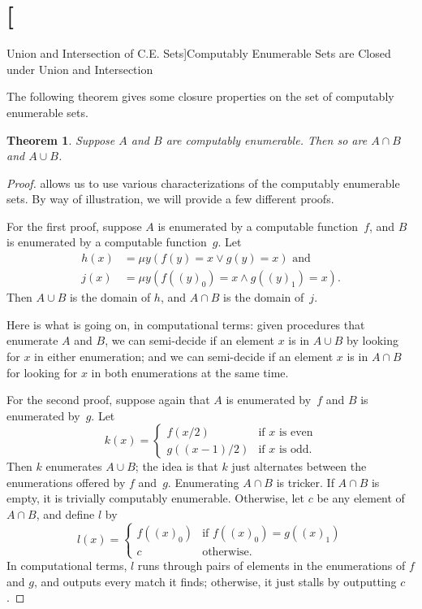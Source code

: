 \documentclass[10pt,a4paper]{article}
\makeatletter
\theoremstyle{plain}
\newtheorem{thm}{Theorem}[section]
\theoremstyle{definition}
\theoremstyle{remark}
\newenvironment{explain}{}{}
\newcommand*{\olfileid}[3]{}
\newcommand*{\olsection}[1]{\section*{#1}}
\newcommand{\olref}{\@ifnextchar[{\olref@i}{\olref@final}}
\def\olref@i[#1]{\@ifnextchar[{\olref@ii}{\olref@final}}
\def\olref@ii[#1]{\@ifnextchar[{\olref@iii}{\olref@final}}
\def\olref@iii[#1]{\olref@final}
\def\olref@final#1{\ref{#1}}
\providecommand{\umin}{\mu}
\makeatother
\begin{document}



\olfileid{cmp}{thy}{clo}

\olsection[Union and Intersection of C.E. Sets]{Computably Enumerable
  Sets are Closed under Union and Intersection}

The following theorem gives some closure properties on the set of
computably enumerable sets.

\begin{thm}
Suppose $A$ and $B$ are computably enumerable. Then so are $A \cap B$
and $A \cup B$.
\end{thm}

\begin{proof}
\olref[eqc]{thm:ce-equiv} allows us to use various characterizations
of the computably enumerable sets. By way of illustration, we will
provide a few different proofs.

For the first proof, suppose $A$ is enumerated by a computable
function~$f$, and $B$ is enumerated by a computable function~$g$. Let
\begin{align*}
h(x) & = \umin{y}{(f(y) = x \lor g(y) = x)} \text{ and}\\
j(x) & = \umin{y}{(f((y)_0) = x \land g((y)_1) = x)}.
\end{align*}
Then $A \cup B$ is the domain of $h$, and $A \cap B$ is the domain
of~$j$.

\begin{explain}
Here is what is going on, in computational terms: given
procedures that enumerate $A$ and $B$, we can semi-decide if an
element $x$ is in $A \cup B$ by looking for $x$ in either enumeration;
and we can semi-decide if an element $x$ is in $A \cap B$ for looking
for $x$ in both enumerations at the same time.
\end{explain}

For the second proof, suppose again that $A$ is enumerated by~$f$ and
$B$ is enumerated by~$g$. Let
\[
k(x) = \begin{cases}
f(x/2) & \text{if $x$ is even} \\
g((x-1)/2) & \text{if $x$ is odd.}
\end{cases}
\]
Then $k$ enumerates $A \cup B$; the idea is that $k$ just alternates
between the enumerations offered by $f$ and~$g$. Enumerating $A \cap
B$ is tricker. If $A \cap B$ is empty, it is trivially computably
enumerable. Otherwise, let $c$ be any element of $A \cap B$, and
define $l$ by
\[
l(x) = \begin{cases}
f((x)_0) & \text{if $f((x)_0) = g((x)_1)$} \\
c & \text{otherwise.}
\end{cases}
\]
In computational terms, $l$ runs through pairs of elements in the
enumerations of $f$ and $g$, and outputs every match it finds;
otherwise, it just stalls by outputting $c$.


\end{proof}
\end{document}
